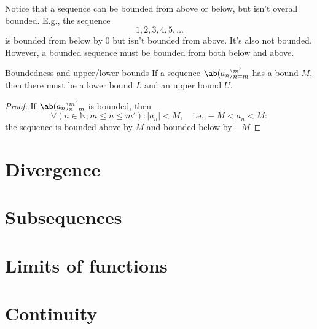 Notice that a sequence can be bounded from above or below, but isn't overall bounded. E.g., the sequence
\begin{equation}
  1, 2, 3, 4, 5, \dots
\end{equation}
is bounded from below by \(0\) but isn't bounded from above. It's also not bounded. However, a bounded sequence must be bounded from both below and above.
\begin{cor}{Boundedness and upper/lower bounds}{}
  If a sequence \(\sequence{a_n}{n = m}{m'}\) has a bound \(M\), then there must be a lower bound \(L\) and an upper bound \(U\).
\end{cor}
\begin{proof}
  If \(\sequence{a_n}{n = m}{m'}\) is bounded, then
  \begin{equation}
    \forall (n \in \mathbb{N} ; m \leq n \leq m') : |a_n| < M, \quad \textrm{i.e.,} - M < a_n < M:
  \end{equation}
  the sequence is bounded above by \(M\) and bounded below by \(-M\)
\end{proof}



\section{Divergence}

\section{Subsequences}

\section{Limits of functions}

\section{Continuity}
